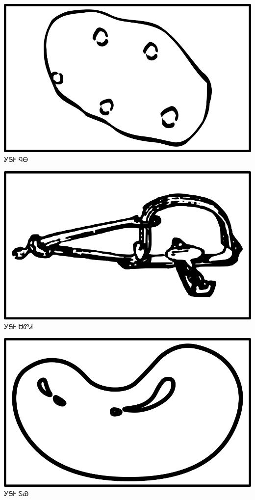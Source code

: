 \documentclass[avery5371]{flashcards}%
\begin{document}
    \begin{flashcard}{
        \includegraphics[width=0.95\columnwidth,height=.51\columnwidth,keepaspectratio]{../artwork/objects-neutral/nuna}
    }
        \Huge ᎩᎦᎨ ᏄᎾ
    \end{flashcard}

    \begin{flashcard}{
        \includegraphics[width=0.95\columnwidth,height=.51\columnwidth,keepaspectratio]{../artwork/objects-neutral/sadvdi}
    }
        \Huge ᎩᎦᎨ ᏌᏛᏗ
    \end{flashcard}

    \begin{flashcard}{
        \includegraphics[width=0.95\columnwidth,height=.51\columnwidth,keepaspectratio]{../artwork/objects-neutral/tuya}
    }
        \Huge ᎩᎦᎨ ᏚᏯ
    \end{flashcard}
\end{document}
